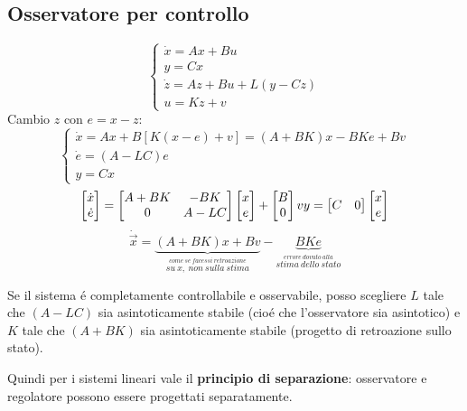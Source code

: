\documentclass[../main.tex]{subfiles}
\begin{document}
	\subsection{Osservatore per controllo}
		\[
			\begin{cases}
				\dot x = Ax + Bu\\
				y = Cx\\
				\dot z = Az + Bu + L(y-Cz)\\
				u = Kz + v
			\end{cases}
		\]
		Cambio $ z $ con $ e = x-z $:
		\[
			\begin{cases}
				\dot x = Ax + B\left[ K(x-e)+v \right] = (A+BK) x - BKe + Bv\\
				\dot e = (A-LC) e\\
				y = Cx
			\end{cases}
		\]
		\[
			\begin{bmatrix}
				\dot x\\
				\dot e
			\end{bmatrix} = 
			\begin{bmatrix}
				A+BK & -BK\\
				0 & A-LC
			\end{bmatrix}
			\begin{bmatrix}
				x\\
				e
			\end{bmatrix} +
			\begin{bmatrix}
				B\\
				0
			\end{bmatrix} v
			\\
			y =
			\begin{bmatrix}
				C & 0
			\end{bmatrix}
			\begin{bmatrix}
				x\\
				e
			\end{bmatrix}
		\]
		\[
			\dot{\vec x} = \underbrace{(A+BK)x + Bv}_{\stackrel{come\ se\ facessi\ retroazione}{su\ x,\ non\ sulla\ stima}} - \underbrace{BKe}_{\stackrel{errore\ dovuto\ alla}{stima\ dello\ stato}}
		\]
		
		Se il sistema \'e completamente controllabile e osservabile, posso scegliere $ L $ tale che $ (A-LC) $ sia asintoticamente stabile (cio\'e che l'osservatore sia asintotico) e $ K $ tale che $ (A+BK) $ sia asintoticamente stabile (progetto di retroazione sullo stato).
		
		Quindi per i sistemi lineari vale il \textbf{principio di separazione}: osservatore e regolatore possono essere progettati separatamente.
		
\end{document}

